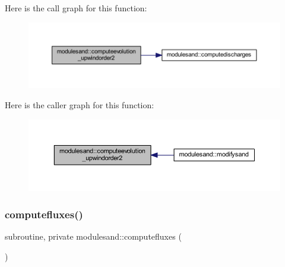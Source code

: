 Here is the call graph for this function\+:\nopagebreak
\begin{figure}[H]
\begin{center}
\leavevmode
\includegraphics[width=350pt]{namespacemodulesand_ade72cd18189ac41b25eef5f7f97591dc_cgraph}
\end{center}
\end{figure}
Here is the caller graph for this function\+:\nopagebreak
\begin{figure}[H]
\begin{center}
\leavevmode
\includegraphics[width=350pt]{namespacemodulesand_ade72cd18189ac41b25eef5f7f97591dc_icgraph}
\end{center}
\end{figure}
\mbox{\label{namespacemodulesand_a5cbe25a8640cb153443de1585837b7a3}} 
\subsubsection{\texorpdfstring{computefluxes()}{computefluxes()}}
{\footnotesize\ttfamily subroutine, private modulesand\+::computefluxes (\begin{DoxyParamCaption}{ }\end{DoxyParamCaption})\hspace{0.3cm}{\ttfamily [private]}}

